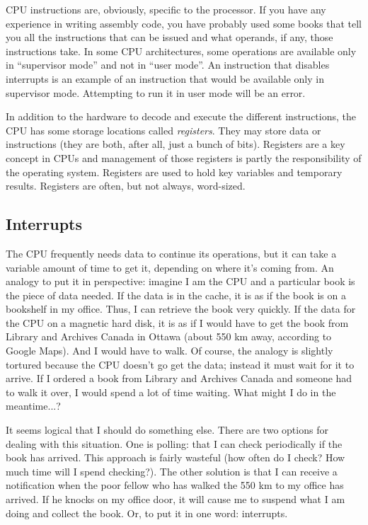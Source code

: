 CPU instructions are, obviously, specific to the processor. If you have any experience in writing assembly code, you have probably used some books that tell you all the instructions that can be issued and what operands, if any, those instructions take. In some CPU architectures, some operations are available only in ``supervisor mode'' and not in ``user mode''. An instruction that disables interrupts is an example of an instruction that would be available only in supervisor mode. Attempting to run it in user mode will be an error.

In addition to the hardware to decode and execute the different instructions, the CPU has some storage locations called \textit{registers}. They may store data or instructions (they are both, after all, just a bunch of bits). Registers are a key concept in CPUs and management of those registers is partly the responsibility of the operating system. Registers are used to hold key variables and temporary results. Registers are often, but not always, word-sized. 


\subsection*{Interrupts}

The CPU frequently needs data to continue its operations, but it can take a variable amount of time to get it, depending on where it's coming from. An analogy to put it in perspective: imagine I am the CPU and a particular book is the piece of data needed. If the data is in the cache, it is as if the book is on a bookshelf in my office. Thus, I can retrieve the book very quickly. If the data for the CPU on a magnetic hard disk, it is as if I would have to get the book from Library and Archives Canada in Ottawa (about 550 km away, according to Google Maps). And I would have to walk. Of course, the analogy is slightly tortured because the CPU doesn't go get the data; instead it must wait for it to arrive. If I ordered a book from Library and Archives Canada and someone had to walk it over, I would spend a lot of time waiting. What might I do in the meantime...?

It seems logical that I should do something else. There are two options for dealing with this situation. One is polling: that I can check periodically if the book has arrived. This approach is fairly wasteful (how often do I check? How much time will I spend checking?). The other solution is that I can receive a notification when the poor fellow who has walked the 550 km to my office has arrived. If he knocks on my office door, it will cause me to suspend what I am doing and collect the book. Or, to put it in one word: interrupts.

